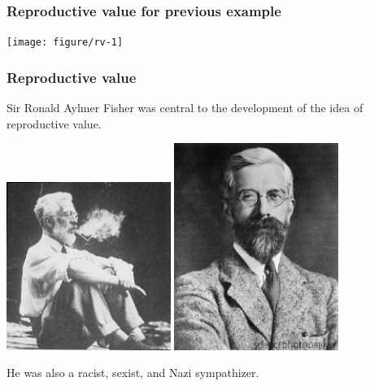 \documentclass[color=usenames,dvipsnames]{beamer}\usepackage[]{graphicx}\usepackage[]{color}
\begin{document}



\begin{frame}[fragile]
  \frametitle{Reproductive value for previous example}

\centering
\texttt{[image: figure/rv-1]} \\
\end{frame}




\begin{frame}
  \frametitle{Reproductive value}
  Sir Ronald Aylmer Fisher was central to the development of the idea
  of reproductive value.
  \begin{center}
    \includegraphics[width=0.4\textwidth]{figs/fisher1} \hspace{12pt} %
    \includegraphics[width=0.4\textwidth]{figs/fisher2}
  \end{center}
  He was also a racist, sexist, and Nazi sympathizer.
\end{frame}
\end{document}
